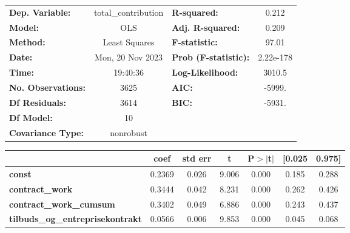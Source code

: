 \begin{center}
\begin{tabular}{lclc}
\toprule
\textbf{Dep. Variable:}                  & total\_contribution & \textbf{  R-squared:         } &     0.212   \\
\textbf{Model:}                          &         OLS         & \textbf{  Adj. R-squared:    } &     0.209   \\
\textbf{Method:}                         &    Least Squares    & \textbf{  F-statistic:       } &     97.01   \\
\textbf{Date:}                           &   Mon, 20 Nov 2023  & \textbf{  Prob (F-statistic):} & 2.22e-178   \\
\textbf{Time:}                           &       19:40:36      & \textbf{  Log-Likelihood:    } &    3010.5   \\
\textbf{No. Observations:}               &          3625       & \textbf{  AIC:               } &    -5999.   \\
\textbf{Df Residuals:}                   &          3614       & \textbf{  BIC:               } &    -5931.   \\
\textbf{Df Model:}                       &            10       & \textbf{                     } &             \\
\textbf{Covariance Type:}                &      nonrobust      & \textbf{                     } &             \\
\bottomrule
\end{tabular}
\begin{tabular}{lcccccc}
                                         & \textbf{coef} & \textbf{std err} & \textbf{t} & \textbf{P$> |$t$|$} & \textbf{[0.025} & \textbf{0.975]}  \\
\midrule
\textbf{const}                           &       0.2369  &        0.026     &     9.006  &         0.000        &        0.185    &        0.288     \\
\textbf{contract\_work}                  &       0.3444  &        0.042     &     8.231  &         0.000        &        0.262    &        0.426     \\
\textbf{contract\_work\_cumsum}          &       0.3402  &        0.049     &     6.886  &         0.000        &        0.243    &        0.437     \\
\textbf{tilbuds\_og\_entreprisekontrakt} &       0.0566  &        0.006     &     9.853  &         0.000        &        0.045    &        0.068     \\

\end{tabular}
\end{center}
